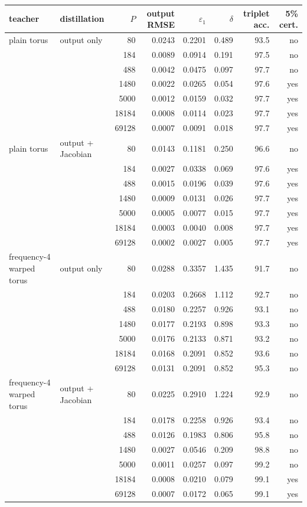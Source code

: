 \begin{tabular}{llrrrrrr}
\toprule
teacher & distillation & $P$ & output RMSE & $\varepsilon_1$ & $\delta$ & triplet acc. & 5\% cert. \\
\midrule
plain torus & output only & 80 & 0.0243 & 0.2201 & 0.489 & 93.5 & no \\
 &  & 184 & 0.0089 & 0.0914 & 0.191 & 97.5 & no \\
 &  & 488 & 0.0042 & 0.0475 & 0.097 & 97.7 & no \\
 &  & 1480 & 0.0022 & 0.0265 & 0.054 & 97.6 & yes \\
 &  & 5000 & 0.0012 & 0.0159 & 0.032 & 97.7 & yes \\
 &  & 18184 & 0.0008 & 0.0114 & 0.023 & 97.7 & yes \\
 &  & 69128 & 0.0007 & 0.0091 & 0.018 & 97.7 & yes \\
plain torus & output + Jacobian & 80 & 0.0143 & 0.1181 & 0.250 & 96.6 & no \\
 &  & 184 & 0.0027 & 0.0338 & 0.069 & 97.6 & yes \\
 &  & 488 & 0.0015 & 0.0196 & 0.039 & 97.6 & yes \\
 &  & 1480 & 0.0009 & 0.0131 & 0.026 & 97.7 & yes \\
 &  & 5000 & 0.0005 & 0.0077 & 0.015 & 97.7 & yes \\
 &  & 18184 & 0.0003 & 0.0040 & 0.008 & 97.7 & yes \\
 &  & 69128 & 0.0002 & 0.0027 & 0.005 & 97.7 & yes \\
\midrule
frequency-4 warped torus & output only & 80 & 0.0288 & 0.3357 & 1.435 & 91.7 & no \\
 &  & 184 & 0.0203 & 0.2668 & 1.112 & 92.7 & no \\
 &  & 488 & 0.0180 & 0.2257 & 0.926 & 93.1 & no \\
 &  & 1480 & 0.0177 & 0.2193 & 0.898 & 93.3 & no \\
 &  & 5000 & 0.0176 & 0.2133 & 0.871 & 93.2 & no \\
 &  & 18184 & 0.0168 & 0.2091 & 0.852 & 93.6 & no \\
 &  & 69128 & 0.0131 & 0.2091 & 0.852 & 95.3 & no \\
frequency-4 warped torus & output + Jacobian & 80 & 0.0225 & 0.2910 & 1.224 & 92.9 & no \\
 &  & 184 & 0.0178 & 0.2258 & 0.926 & 93.4 & no \\
 &  & 488 & 0.0126 & 0.1983 & 0.806 & 95.8 & no \\
 &  & 1480 & 0.0027 & 0.0546 & 0.209 & 98.8 & no \\
 &  & 5000 & 0.0011 & 0.0257 & 0.097 & 99.2 & no \\
 &  & 18184 & 0.0008 & 0.0210 & 0.079 & 99.1 & yes \\
 &  & 69128 & 0.0007 & 0.0172 & 0.065 & 99.1 & yes \\
\bottomrule
\end{tabular}

